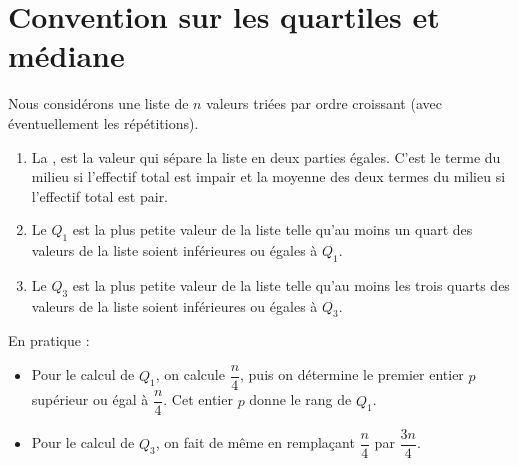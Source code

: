 \section{Convention sur les quartiles et médiane}

\begin{definition}
    Nous considérons une liste de \( n\) valeurs triées par ordre croissant (avec éventuellement les répétitions).
    \begin{enumerate}
        \item
            La , est la valeur qui sépare la liste en deux parties égales. C'est le terme du milieu si l'effectif total est impair et la moyenne des deux termes du milieu si l'effectif total est pair.
      \item 
          Le  $Q_1$ est la plus petite valeur de la liste telle qu'au moins un quart des valeurs de la liste soient inférieures ou égales à $Q_1$.
        \item
            Le  $Q_3$ est la plus petite valeur de la liste telle qu'au moins les trois quarts des valeurs de la liste soient inférieures ou égales à $Q_3$.
  \end{enumerate}
\end{definition}
En pratique :
\begin{itemize}
    \item 
  Pour le calcul de $Q_1$, on calcule $\dfrac{n}4$, puis on détermine le premier entier $p$ supérieur ou égal à $\dfrac{n}4$. Cet entier $p$ donne le rang de $Q_1$. 
  \item
  Pour le calcul de $Q_3$, on fait de même en remplaçant $\dfrac{n}4$ par $\dfrac{3n}4$. 
\end{itemize}


